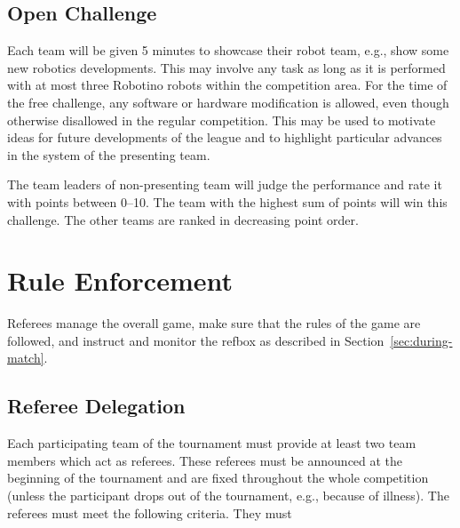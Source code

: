 \documentclass[12pt,twoside]{article}
\newcommand{\refsec}[1]{Section~\ref{#1}}
\begin{document}
%

\subsection{Open Challenge~}
Each team will be given 5 minutes to showcase their robot team, e.g.,
show some new robotics developments. This may involve any task as long
as it is performed with at most three Robotino robots within the
competition area. For the time of the free challenge, any software or
hardware modification is allowed, even though otherwise disallowed in
the regular competition. This may be used to motivate ideas for future
developments of the league and to highlight particular advances in the
system of the presenting team.

The team leaders of non-presenting team will judge the performance and
rate it with points between 0--10.  The team with the highest sum of
points will win this challenge. The other teams are ranked in
decreasing point order.


\section{Rule Enforcement}
\label{sec:rule-enforcement}
Referees manage the overall game, make sure that the rules of the game
are followed, and instruct and monitor the \ac{refbox} as described in
\refsec{sec:during-match}.

\subsection{Referee Delegation}
Each participating team of the tournament must provide at least two
team members which act as referees. These referees must be announced
at the beginning of the tournament and are fixed throughout the whole
competition (unless the participant drops out of the tournament,
e.g., because of illness). The referees must meet the following
criteria. They must
\end{document}

